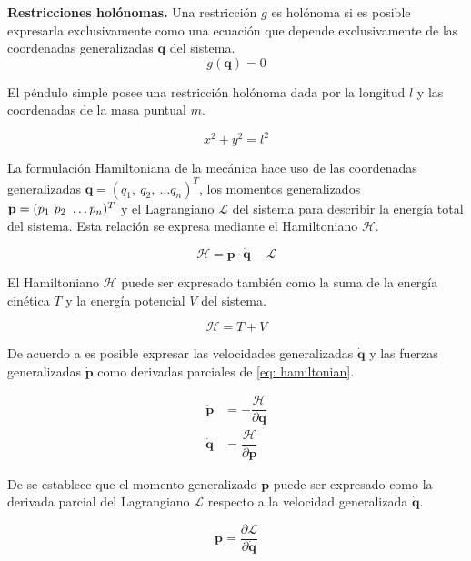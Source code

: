 \textbf{Restricciones holónomas.} Una restricción $g$ es holónoma si es posible 
expresarla exclusivamente como una ecuación que depende exclusivamente de 
las coordenadas generalizadas $\mathbf q$ del sistema.
\begin{equation}
 g(\mathbf q) = 0
\end{equation}

El péndulo simple posee una restricción holónoma dada por la longitud $l$
y las coordenadas de la masa puntual $m$.

\begin{equation}
 x^2 + y^2 = l^2
 \label{eq: holonomic constraint}
\end{equation}


La formulación Hamiltoniana de la mecánica hace uso de las coordenadas 
generalizadas $\mathbf q = (q_1, \ q_2, \ \dots q_n)^T$, 
los momentos generalizados $\bold p = (p_1 \ p_2 \ \dots p_n)^T$ 
y el Lagrangiano $\mathcal L$ del sistema para describir la energía total del sistema. 
Esta relación se expresa mediante el Hamiltoniano $\mathcal H$. 

\begin{equation}
 \mathcal H = \mathbf p \cdot \mathbf {\dot q} - \mathcal L
 \label{eq: hamiltonian}
\end{equation}

El Hamiltoniano $\mathcal H$ puede ser expresado también como la 
suma de la energía cinética $T$ y la energía  potencial $V$
del sistema.

\begin{equation}
 \mathcal H = T + V
\end{equation}

De acuerdo a \cite{susskind2014theoretical} es posible expresar las velocidades
generalizadas $\mathbf{\dot q}$ y las fuerzas generalizadas $\mathbf{\dot p}$ como 
derivadas parciales de \eqref{eq: hamiltonian}.

\begin{subequations}
 \begin{align}
  \mathbf{\dot p} & = - \dfrac{\mathcal H}{\partial \mathbf q}\\
  \mathbf{\dot q} & = \dfrac{\mathcal H}{\partial \mathbf p}
 \end{align}
\end{subequations}

De \cite{Montague:399399} se establece que el momento generalizado $\mathbf p$
puede ser expresado como la derivada parcial del Lagrangiano $\mathcal L$ respecto a
la velocidad generalizada $\mathbf {\dot q}$.

\begin{equation}
 \mathbf p = \dfrac{\partial \mathcal L}{\partial \mathbf{\dot q}}
 \label{eq: generalized momentum}
\end{equation}










